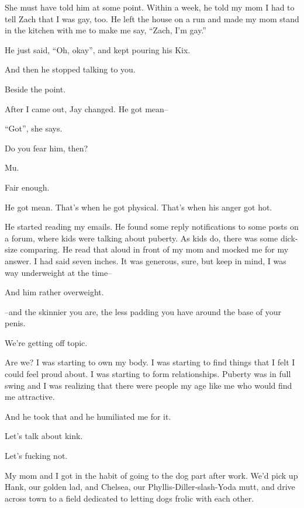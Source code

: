 She must have told him at some point. Within a week, he told my mom I had to tell Zach that I was gay, too. He left the house on a run and made my mom stand in the kitchen with me to make me say, ``Zach, I'm gay.''

He just said, ``Oh, okay'', and kept pouring his Kix.

\begin{ally}
And then he stopped talking to you.
\end{ally}
Beside the point.

After I came out, Jay changed. He got mean--

\begin{ally}
``Got'', she says.
\end{ally}
Do you fear him, then?

\begin{ally}
Mu.
\end{ally}
Fair enough.

He got mean. That's when he got physical. That's when his anger got hot.

He started reading my emails. He found some reply notifications to some posts on a forum, where kids were talking about puberty. As kids do, there was some dick-size comparing. He read that aloud in front of my mom and mocked me for my answer. I had said seven inches. It was generous, sure, but keep in mind, I was way underweight at the time--

\begin{ally}
And him rather overweight.
\end{ally}
--and the skinnier you are, the less padding you have around the base of your penis.

\begin{ally}
We're getting off topic.
\end{ally}
Are we? I was starting to own my body. I was starting to find things that I felt I could feel proud about. I was starting to form relationships. Puberty was in full swing and I was realizing that there were people my age like me who would find me attractive.

And he took that and he humiliated me for it.

\begin{ally}
Let's talk about kink.
\end{ally}
Let's fucking not.
\newpage

\noindent My mom and I got in the habit of going to the dog part after work. We'd pick up Hank, our golden lad, and Chelsea, our Phyllis-Diller-slash-Yoda mutt, and drive across town to a field dedicated to letting dogs frolic with each other.

